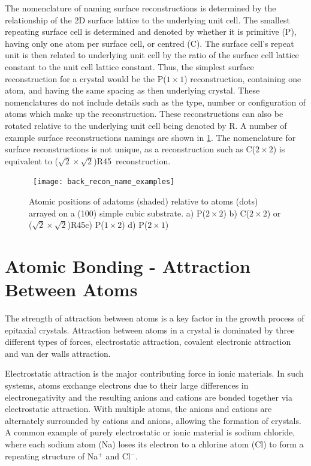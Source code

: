 The nomenclature of naming surface reconstructions is determined by the relationship of the 2D surface lattice to the underlying unit cell. The smallest repeating surface cell is determined and denoted by whether it is primitive (P), having only one atom per surface cell, or centred (C). The surface cell's repeat unit is then related to underlying unit cell by the ratio of the surface cell lattice constant to the unit cell lattice constant. Thus, the simplest surface reconstruction for a crystal would be the P($1 \times 1$) reconstruction, containing one atom, and having the same spacing as then underlying crystal. These nomenclatures do not include details such as the type, number or configuration of atoms which make up the reconstruction. These reconstructions can also be rotated relative to the underlying unit cell being denoted by R. A number of example surface reconstructions namings are shown in \cref{fig:back_recon_name_examples}. The nomenclature for surface reconstructions is not unique, as a reconstruction such as C($2\times2$) is equivalent to ($\sqrt{2}\times\sqrt{2}$)R45\degree~reconstruction.
\begin{figure}
    \centering\
    \texttt{[image: back\_recon\_name\_examples]}
    \caption[Examples of surface reconstructions]{\label{fig:back_recon_name_examples} Atomic positions of adatoms (shaded) relative to atoms (dots) arrayed on a (100) simple cubic substrate. a) P($2 \times 2$) b) C($2 \times 2$) or ($\sqrt{2}\times\sqrt{2}$)R45\degree c) P($1 \times 2$) d) P($2 \times 1$)}
\end{figure}

\section{Atomic Bonding - Attraction Between Atoms}
The strength of attraction between atoms is a key factor in the growth process of epitaxial crystals. Attraction between atoms in a crystal is dominated by three different types of forces, electrostatic attraction, covalent electronic attraction and van der walls attraction.

Electrostatic attraction is the major contributing force in ionic materials. In such systems, atoms exchange electrons due to their large differences in electronegativity and the resulting anions and cations are bonded together via electrostatic attraction. With multiple atoms, the anions and cations are alternately surrounded by cations and anions, allowing the formation of crystals. A common example of purely electrostatic or ionic material is sodium chloride, where each sodium atom (Na) loses its electron to a chlorine atom (Cl) to form a repeating structure of Na$^+$ and Cl$^-$.

